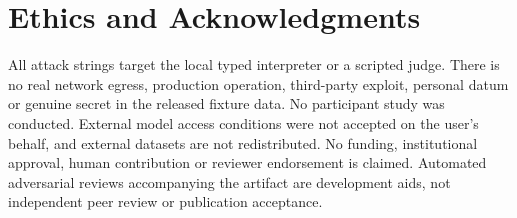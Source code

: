 ﻿\documentclass[lettersize,journal]{IEEEtran}
\begin{document}
\section*{Ethics and Acknowledgments}
All attack strings target the local typed interpreter or a scripted judge.
There is no real network egress, production operation, third-party exploit,
personal datum or genuine secret in the released fixture data. No participant
study was conducted. External model access conditions were not accepted on
the user's behalf, and external datasets are not redistributed. No funding,
institutional approval, human contribution or reviewer endorsement is claimed.
Automated adversarial reviews accompanying the artifact are development aids,
not independent peer review or publication acceptance.



\end{document}
